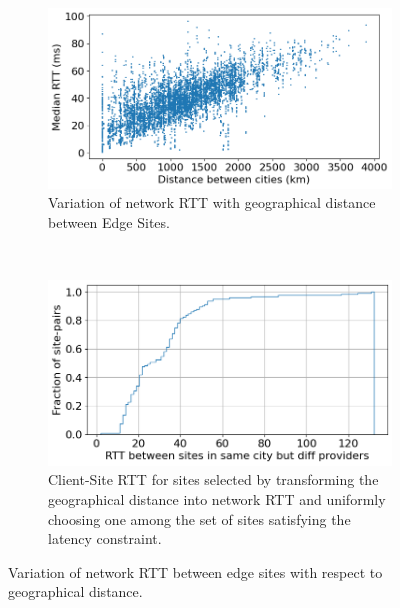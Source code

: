 \begin{figure}[t!]
    \centering
    \begin{subfigure}[t]{0.45\textwidth}
        \centering
        \includegraphics[width=\textwidth]{figures/mechanisms/nw_proximity/shortest-rtt-vs-dist.png}
        \caption{Variation of network RTT with geographical distance between Edge Sites.}
        \label{fig:geodist_vs_rtt}
    \end{subfigure}%
    ~ 
    \begin{subfigure}[t]{0.45\textwidth}
        \centering
        \includegraphics[width=\textwidth]{figures/mechanisms/nw_proximity/same_city_diff_provider_rtts.png}
        \caption{Client-Site RTT for sites selected by transforming the geographical distance into network RTT and uniformly choosing one among the set of sites satisfying the latency constraint.}
        \label{fig:same_city_diff_prov}
    \end{subfigure}
    \caption{Variation of network RTT between edge sites with respect to geographical distance.}
\end{figure}

